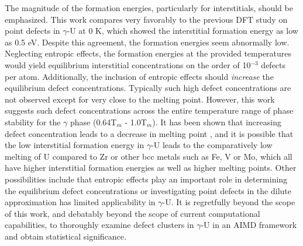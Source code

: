 \documentclass[review]{elsarticle}
\begin{document}
The magnitude of the formation energies, particularly for interstitials, should be emphasized. This work compares very favorably to the previous DFT study on point defects in $\gamma$-U at 0 K\cite{beeler2010}, which showed the interstitial formation energy as low as 0.5 eV. Despite this agreement, the formation energies seem abnormally low.  Neglecting entropic effects, the formation energies at the provided temperatures would yield equilibrium interstitial concentrations on the order of 10$^{-3}$ defects per atom. Additionally, the inclusion of entropic effects should \textit{increase} the equilibrium defect concentrations. Typically such high defect concentrations are not observed except for very close to the melting point. However, this work suggests such defect concentrations across the entire temperature range of phase stability for the $\gamma$ phase (0.64T$_m$ - 1.0T$_m$). It has been shown that increasing defect concentration leads to a decrease in melting point \cite{sorkin2003}, and it is possible that the low interstitial formation energy in $\gamma$-U leads to the comparatively low melting of U compared to Zr or other bcc metals \cite{williams1990} such as Fe, V or Mo, which all have higher interstitial formation energies \cite{mendelev2010, mendelev2009, nguyen2006} as well as higher melting points. Other possibilities include that entropic effects play an important role in determining the equilibrium defect concentrations or investigating point defects in the dilute approximation has limited applicability in $\gamma$-U. It is regretfully beyond the scope of this work, and debatably beyond the scope of current computational capabilities, to thoroughly examine defect clusters in $\gamma$-U in an AIMD framework and obtain statistical significance. 

\end{document}
